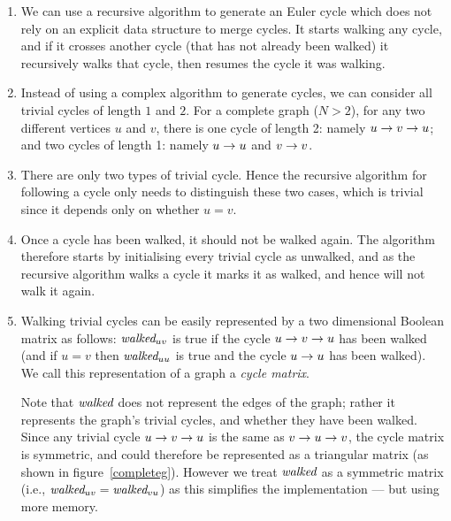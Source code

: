 \documentclass[12pt]{article}
\begin{document}
\begin{enumerate}\raggedright
\item
We can use a recursive algorithm to generate an Euler cycle which does not rely on an explicit data structure to merge cycles. It starts walking any cycle, and if it crosses another cycle (that has not already been walked) it recursively walks that cycle, then resumes the cycle it was walking.

\item
Instead of using a complex algorithm to generate cycles, we can consider all trivial cycles of length $1$ and $2$. For a complete graph ($N>2$), for any two different vertices $u$ and $v$, there is one cycle of length 2: namely $\pair uv$; and two cycles of length 1: namely $\pair uu$ and $\pair vv$.

\item
There are only two types of trivial cycle. Hence the recursive algorithm for following a cycle only needs to distinguish these two cases, which is trivial since it depends only on whether $u=v$.

\item
Once a cycle has been walked, it should not be walked again. The algorithm therefore starts by initialising every trivial cycle as unwalked, and as the recursive algorithm walks a cycle it marks it as walked, and hence will not walk it again.

\item
Walking trivial cycles can be easily represented by a two dimensional Boolean matrix as follows: $\mbox{\it walked}_{uv}$ is true if the cycle $\pair uv$ has been walked (and if $u=v$ then $\mbox{\it walked}_{uu}$ is true and the cycle $\pair uu$ has been walked). We call this representation of a graph a \emph{cycle matrix}.

Note that $\mbox{\it walked}$ does not represent the edges of the graph; rather it represents the graph's trivial cycles, and whether they have been walked. Since any trivial cycle $\pair uv$ is the same as $\pair vu$, the cycle matrix is symmetric, and could therefore be represented as a triangular matrix (as shown in figure~\ref{completeg}). However we treat $\mbox{\it walked}$ as a symmetric matrix (i.e., $\mbox{\it walked}_{uv}=\mbox{\it walked}_{vu}$) as this simplifies the implementation --- but using more memory.
\end{enumerate}
\end{document}
